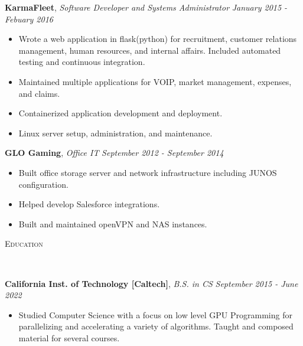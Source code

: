 \documentclass[9pt]{article}
\newenvironment{changemargin}[2]{%
  \begin{list}{}{%
    \setlength{\topsep}{0pt}%
    \setlength{\leftmargin}{#1}%
    \setlength{\rightmargin}{#2}%
    \setlength{\listparindent}{\parindent}%
    \setlength{\itemindent}{\parindent}%
    \setlength{\parsep}{\parskip}%
  }%
  \item[]}{\end{list}
}
\newcommand{\lineover}{
	\begin{changemargin}{-0.05in}{-0.05in}
		\vspace*{-8pt}
		\hrulefill \\
		\vspace*{-2pt}
	\end{changemargin}
}
\newcommand{\header}[1]{
	\begin{changemargin}{-0.5in}{-0.5in}
		\scshape{#1}\\
  	\lineover
	\end{changemargin}
}
\newenvironment{body} {
	\vspace*{-16pt}
	\begin{changemargin}{-0.25in}{-0.5in}
  }	
	{\end{changemargin}
}
\begin{document}
\begin{body}
	\textbf{KarmaFleet}, \emph{Software Developer and Systems Administrator} \hfill \emph{January 2015 - Febuary 2016}\\
	\vspace*{-3pt}
	\begin{itemize} \itemsep -0pt %
		\item Wrote a web application in flask(python) for recruitment, customer relations management, human resources, and internal affairs. Included automated testing and continuous integration.
		\item Maintained multiple applications for VOIP, market management, expenses, and claims.
		\item Containerized application development and deployment.
		\item Linux server setup, administration, and maintenance.
	\end{itemize}
	\vspace*{-2pt}

	\textbf{GLO Gaming}, \emph{Office IT} \hfill \emph{September 2012 - September 2014}\\
	\vspace*{-3pt}
	\begin{itemize} \itemsep -0pt %
		\item Built office storage server and network infrastructure including JUNOS configuration.
		\item Helped develop Salesforce integrations.
		\item Built and maintained openVPN and NAS instances.
	\end{itemize}
	\vspace*{-2pt}

	\smallskip
	\vspace*{-3pt}
	\vspace*{-5pt}
	\smallskip
\end{body}
	\header{Education}
	\begin{body}
		\vspace{16pt}
		\textbf{California Inst. of Technology [Caltech]}{}, \emph{B.S. in CS} \hfill \emph{September 2015 - June 2022}{} \\
		\vspace{-3pt}
		\begin{itemize} \itemsep -0pt
			\item Studied Computer Science with a focus on low level GPU Programming for
			parallelizing and accelerating a variety of algorithms. Taught and composed material for
			several courses.
		\end{itemize}
	\end{body}
\end{document}
